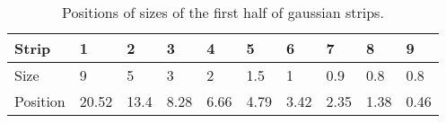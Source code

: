 \begin{table}[!ht]
  \centering
  \caption[Positions of sizes of the first half of gaussian strips]{Positions of sizes of the first half of gaussian strips.}
  \label{chap4:GaussianStrips}
  \begin{tabularx}{\linewidth}{lXXXXXXXXX}
    \toprule
    Strip    & 1     & 2    & 3    & 4    & 5    & 6    & 7    & 8    & 9    \\
    \midrule
    Size     & 9     & 5    & 3    & 2    & 1.5  & 1    & 0.9  & 0.8  & 0.8  \\
    Position & 20.52 & 13.4 & 8.28 & 6.66 & 4.79 & 3.42 & 2.35 & 1.38 & 0.46 \\
    \bottomrule
  \end{tabularx}
\end{table}
